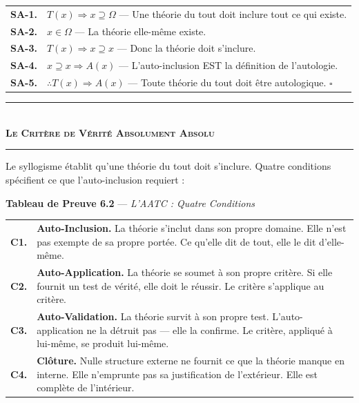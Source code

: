 \documentclass[10pt, openany, oneside]{book}
\renewcommand{\normalsize}{\fontsize{10}{13}\selectfont}
\renewcommand{\footnotesize}{\fontsize{8.5}{11}\selectfont}
\begin{document}
{\footnotesize
\noindent\begin{tabular}{r p{}}
\textbf{SA-1.} & $T(x) \Rightarrow x \supseteq \Omega$ --- Une théorie du tout doit inclure tout ce qui existe. \\[0.3em]
\textbf{SA-2.} & $x \in \Omega$ --- La théorie elle-même existe. \\[0.3em]
\textbf{SA-3.} & $T(x) \Rightarrow x \supseteq x$ --- Donc la théorie doit s'inclure. \\[0.3em]
\textbf{SA-4.} & $x \supseteq x \Rightarrow A(x)$ --- L'auto-inclusion EST la définition de l'autologie. \\[0.3em]
\textbf{SA-5.} & $\therefore T(x) \Rightarrow A(x)$ --- Toute théorie du tout doit être autologique. $\square$ \\[0.3em]
\end{tabular}
}

\vspace{1.5em}


\begin{center}
    \rule{0.3\textwidth}{0.4pt}\\[0.5em]
    {\normalsize\bfseries\scshape Le Critère de Vérité Absolument Absolu}\\[0.3em]
    \rule{0.3\textwidth}{0.4pt}
\end{center}

\vspace{1em}

\noindent Le syllogisme établit qu'une théorie du tout doit s'inclure. Quatre conditions spécifient ce que l'auto-inclusion requiert :

\vspace{0.5em}

\textbf{Tableau de Preuve 6.2} --- \textit{L'AATC : Quatre Conditions}

\vspace{0.5em}

{\footnotesize
\noindent\begin{tabular}{r p{}}
\textbf{C1.} & \textbf{Auto-Inclusion.} La théorie s'inclut dans son propre domaine. Elle n'est pas exempte de sa propre portée. Ce qu'elle dit de tout, elle le dit d'elle-même. \\[0.3em]
\textbf{C2.} & \textbf{Auto-Application.} La théorie se soumet à son propre critère. Si elle fournit un test de vérité, elle doit le réussir. Le critère s'applique au critère. \\[0.3em]
\textbf{C3.} & \textbf{Auto-Validation.} La théorie survit à son propre test. L'auto-application ne la détruit pas --- elle la confirme. Le critère, appliqué à lui-même, se produit lui-même. \\[0.3em]
\textbf{C4.} & \textbf{Clôture.} Nulle structure externe ne fournit ce que la théorie manque en interne. Elle n'emprunte pas sa justification de l'extérieur. Elle est complète de l'intérieur. \\[0.3em]
\end{tabular}
}
\end{document}
